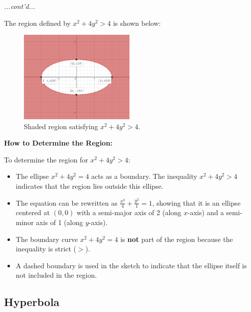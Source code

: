 \documentclass{article}
\begin{document}
\begin{examplebox}
\textit{...cont'd...}
\begin{solutionbox}
    The region defined by \( x^2 + 4y^2 > 4 \) is shown below:
    \begin{figure}[H]
        \centering
        \includegraphics[width=0.5\textwidth]{x^2 + 4y^2 gt 4 region.png}
        \caption{Shaded region satisfying \( x^2 + 4y^2 > 4 \).}
        \label{fig:ellipse_region}
    \end{figure}

    \textbf{How to Determine the Region:}
    \begin{conceptbox}
    To determine the region for \( x^2 + 4y^2 > 4 \):
    \begin{itemize}
        \item The ellipse \( x^2 + 4y^2 = 4 \) acts as a boundary. The inequality \( x^2 + 4y^2 > 4 \) indicates that the region lies outside this ellipse.
        \item The equation can be rewritten as \( \frac{x^2}{4} + \frac{y^2}{1} = 1 \), showing that it is an ellipse centered at \( (0,0) \) with a semi-major axis of 2 (along \( x \)-axis) and a semi-minor axis of 1 (along \( y \)-axis).
        \item The boundary curve \( x^2 + 4y^2 = 4 \) is \textbf{not} part of the region because the inequality is strict (\( > \)).
        \item A dashed boundary is used in the sketch to indicate that the ellipse itself is not included in the region.
    \end{itemize}
    \end{conceptbox}
\end{solutionbox}    
\end{examplebox}

\subsection*{Hyperbola}
\end{document}
